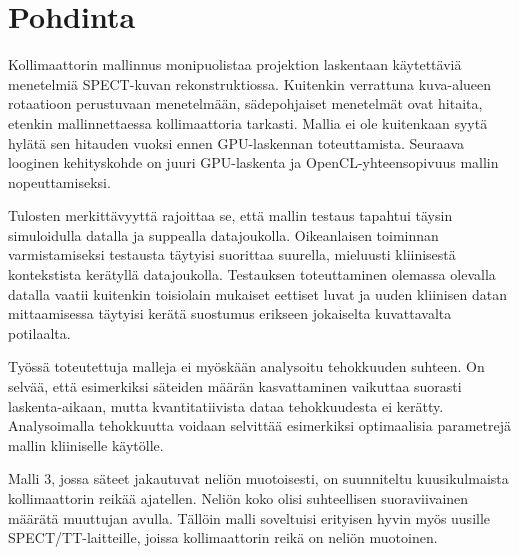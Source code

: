 \section{Pohdinta}
Kollimaattorin mallinnus monipuolistaa projektion laskentaan käytettäviä menetelmiä SPECT-kuvan rekonstruktiossa. Kuitenkin verrattuna kuva-alueen rotaatioon perustuvaan menetelmään, sädepohjaiset menetelmät ovat hitaita, etenkin mallinnettaessa kollimaattoria tarkasti. Mallia ei ole kuitenkaan syytä hylätä sen hitauden vuoksi ennen GPU-laskennan toteuttamista. Seuraava looginen kehityskohde on juuri GPU-laskenta ja OpenCL-yhteensopivuus mallin nopeuttamiseksi. 

Tulosten merkittävyyttä rajoittaa se, että mallin testaus tapahtui täysin simuloidulla datalla ja suppealla datajoukolla. Oikeanlaisen toiminnan varmistamiseksi testausta täytyisi suorittaa suurella, mieluusti kliinisestä kontekstista kerätyllä datajoukolla. Testauksen toteuttaminen olemassa olevalla datalla vaatii kuitenkin toisiolain mukaiset eettiset luvat ja uuden kliinisen datan mittaamisessa täytyisi kerätä suostumus erikseen jokaiselta kuvattavalta potilaalta.

Työssä toteutettuja malleja ei myöskään analysoitu tehokkuuden suhteen. On selvää, että esimerkiksi säteiden määrän kasvattaminen vaikuttaa suorasti laskenta-aikaan, mutta kvantitatiivista dataa tehokkuudesta ei kerätty. Analysoimalla tehokkuutta voidaan selvittää esimerkiksi optimaalisia parametrejä mallin kliiniselle käytölle.

Malli 3, jossa säteet jakautuvat neliön muotoisesti, on suunniteltu kuusikulmaista kollimaattorin reikää ajatellen. Neliön koko olisi suhteellisen suoraviivainen määrätä muuttujan avulla. Tällöin malli soveltuisi erityisen hyvin myös uusille SPECT/TT-laitteille, joissa kollimaattorin reikä on neliön muotoinen.